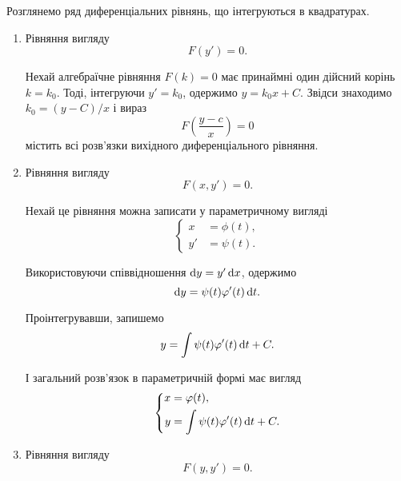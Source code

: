 Розглянемо ряд диференціальних рівнянь, що інтегруються в квадратурах.
\begin{enumerate}
	\item Рівняння вигляду 
	\begin{equation*}
		F(y') = 0.
	\end{equation*}

	Нехай алгебраїчне рівняння $F(k) = 0$ має принаймні один дійсний корінь $k = k_0$. Тоді, інтегруючи $y' = k_0$, одержимо $y = k_0 x + C$. Звідси знаходимо $k_0 = (y - C) / x$ і вираз
	\begin{equation*}
		F \left( \frac{y - c}{x} \right) = 0	
	\end{equation*}
	містить всі розв'язки вихідного диференціального рівняння.

	\item Рівняння вигляду 
	\begin{equation*}
		F(x, y') = 0.
	\end{equation*}

	Нехай це рівняння можна записати у параметричному вигляді
	\begin{equation*}
		\left\{\begin{aligned}
			x &= \phi(t), \\
			y' &= \psi(t).
		\end{aligned}\right.
	\end{equation*}

	Використовуючи співвідношення $\mathop{}\!\mathrm{d} y = y ' \mathop{}\!\mathrm{d} x$, одержимо 
	\begin{equation*}
		\mathop{}\!\mathrm{d} y = \psi(t) \varphi'(t) \mathop{}\!\mathrm{d} t.
	\end{equation*}

	Проінтегрувавши, запишемо
	\begin{equation*}
		y = \int \psi(t) \varphi'(t) \mathop{}\!\mathrm{d} t + C.
	\end{equation*}

	І загальний розв'язок в параметричній формі має вигляд
	\begin{equation*}
		\left\{
			\begin{aligned}
				x &= \varphi(t), \\
				y &= \int \psi(t) \varphi'(t) \mathop{}\!\mathrm{d} t + C.
			\end{aligned}
		\right.
	\end{equation*}
	
	\item Рівняння вигляду 
	\begin{equation*}
		F(y, y') = 0.
	\end{equation*}


\end{enumerate}
